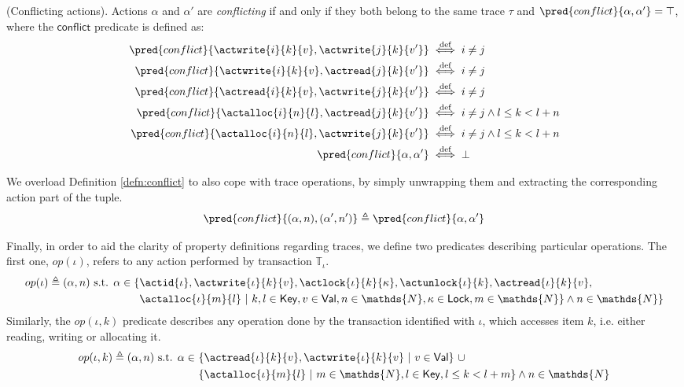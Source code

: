 \begin{defn}
	\label{defn:conflict}
	(Conflicting actions).
	Actions $\alpha$ and $\alpha'$ are \emph{conflicting} if and only if they both belong to the same trace $\tau$ and $\pred{conflict}{\alpha, \alpha'} = \top$, where the $\mathsf{conflict}$ predicate is defined as:
	\begin{align*}
		\pred{conflict}{\actwrite{i}{k}{v}, \actwrite{j}{k}{v'}} &\overset{\text{def}}{\iff} i \neq j
			\\
		\pred{conflict}{\actwrite{i}{k}{v}, \actread{j}{k}{v'}} &\overset{\text{def}}{\iff} i \neq j
			\\
		\pred{conflict}{\actread{i}{k}{v}, \actwrite{j}{k}{v'}} &\overset{\text{def}}{\iff} i \neq j
			\\
		\pred{conflict}{\actalloc{i}{n}{l}, \actread{j}{k}{v'}} &\overset{\text{def}}{\iff} i \neq j \land l \leq k < l + n
			\\
		\pred{conflict}{\actalloc{i}{n}{l}, \actwrite{j}{k}{v'}} &\overset{\text{def}}{\iff} i \neq j \land l \leq k < l + n
			\\
		\pred{conflict}{\alpha, \alpha'} &\overset{\text{def}}{\iff} \bot
	\end{align*}
\end{defn}
We overload Definition \ref{defn:conflict} to also cope with trace operations, by simply unwrapping them and extracting the corresponding action part of the tuple.
\[
	\pred{conflict}{(\alpha, n), (\alpha', n')} \triangleq \pred{conflict}{\alpha, \alpha'}
\]

Finally, in order to aid the clarity of property definitions regarding traces, we define two predicates describing particular operations. The first one, $op(\iota)$, refers to any action performed by transaction $\mathds{T}_\iota$.
\begin{align*}
	op(\iota) \triangleq (\alpha, n) \text{ s.t. } \alpha \in \{ &\actid{\iota}, \actwrite{\iota}{k}{v}, \actlock{\iota}{k}{\kappa}, \actunlock{\iota}{k}, \actread{\iota}{k}{v},
	\\
	&\actalloc{\iota}{m}{l}\ |\ k, l \in \mathsf{Key}, v \in \mathsf{Val}, n \in \mathds{N}, \kappa \in \mathsf{Lock}, m \in \mathds{N} \} \land n \in \mathds{N} \}
\end{align*}
Similarly, the $op(\iota, k)$ predicate describes any operation done by the transaction identified with $\iota$, which accesses item $k$, i.e. either reading, writing or allocating it.
\begin{align*}
	op(\iota, k) \triangleq (\alpha, n) \text{ s.t. } \alpha \in\ &\{ \actread{\iota}{k}{v}, \actwrite{\iota}{k}{v}\ |\ v \in \mathsf{Val} \}\
	\cup \\
	&\{\actalloc{\iota}{m}{l}\ |\ m \in \mathds{N}, l \in \mathsf{Key}, l \leq k < l + m \} \land n \in \mathds{N}
\end{align*}

